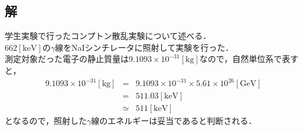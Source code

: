 \documentclass[10pt]{ujarticle}
\begin{document}
\subsection{解}
学生実験で行ったコンプトン散乱実験について述べる．\\
$662 \mathrm{[keV]}$の$\gamma$線をNaIシンチレータに照射して実験を行った．\\
測定対象だった電子の静止質量は$9.1093 \times 10^{-31}\mathrm{[kg]}$なので，自然単位系で表すと，
\begin{eqnarray*}
  9.1093 \times 10^{-31} \mathrm{[kg]} &=& 9.1093 \times 10^{-31} \times 5.61 \times 10^{26} \mathrm{[GeV]} \\
  &=& 511.03 \mathrm{[keV]} \\
  &\simeq& 511 \mathrm{[keV]}
\end{eqnarray*}
となるので，照射した$\gamma$線のエネルギーは妥当であると判断される．
\end{document}
